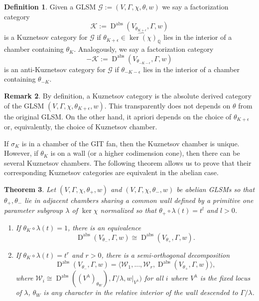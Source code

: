 \documentclass[reqno, 12pt]{amsart}
\newtheorem{theorem}{Theorem}[section]
\theoremstyle{definition}
\newtheorem{definition}[theorem]{Definition}
\newtheorem{remark}[theorem]{Remark}
\newcommand{\op}[1]{\operatorname{#1}}
\newcommand{\newterm}{\textsf}
\newcommand{\dabs}{\op{D}^{\op{abs}}}
\def\ker{\op{\mbox{ker}}}
\def\Q{\op{\mathbb{Q}}}
\numberwithin{equation}{section}
\begin{document}
\begin{definition}\label{def: Kuznetsov category}
    Given a GLSM $\mathcal{G} := (V, \Gamma, \chi, \theta, w)$ we say a factorization category
    $$
    \mathcal K := \dabs(V_{\theta_{K+\epsilon}}, \Gamma, w)
    $$
    is a \newterm{Kuznetsov category} for $\mathcal G$ if $\theta_{K+\epsilon} \in \widehat{\ker(\chi)}_{\Q}$ lies in the interior of a chamber containing $\theta_K$. Analogously, we say a factorization category
    $$
    -\mathcal K := \dabs(V_{\theta_{-K-\epsilon}}, \Gamma, w)
    $$
    is an \newterm{anti-Kuznetsov category} for $\mathcal G$ if $\theta_{-K-\epsilon}$ lies in the interior of a chamber containing $\theta_{-K}$.
\end{definition}

\begin{remark}
By definition, a Kuznetsov category is the absolute derived category of the GLSM $(V, \Gamma, \chi, \theta_{K+\epsilon}, w)$. This transparently does not depends on $\theta$ from the original GLSM.  On the other hand, it apriori depends on the choice of $\theta_{K+\epsilon}$ or, equivalently, the choice of Kuznetsov chamber. 
\end{remark}

If $\sigma_K$ is in a chamber of the GIT fan, then the Kuznetsov chamber is unique. However, if $\theta_K$ is on a wall (or a higher codimension cone), then there can be several Kuznetsov chambers. 
The following theorem \cite[Theorem 5.2.1]{BFKv2} allows us to prove that their corresponding Kuznetsov categories are equivalent in the abelian case.

\begin{theorem}\label{thm: BFK wall crossing} 
Let $(V, \Gamma, \chi, \theta_+, w)$ and $(V, \Gamma, \chi, \theta_-, w)$ be abelian GLSMs so that $\theta_+, \theta_-$ lie in adjacent chambers sharing a common wall defined by a primitive one parameter subgroup $\lambda$ of $\ker \chi$ normalized so that $\theta_+ \circ \lambda(t) = t^l$ and $l >0$.
\begin{enumerate}
\item If $\theta_K \circ \lambda (t)=1$, there is an equivalence
$$
 \dabs( V_{\theta_-}, \Gamma, w ) \cong \dabs(V_{\theta_+}, \Gamma, w).
$$
 \item If $\theta_K \circ \lambda (t) = t^r$  and $r>0$, there is a semi-orthogonal decomposition
$$
 \dabs( V_{\theta_-}, \Gamma, w ) = \langle \mathcal W_1, ..., \mathcal W_r, \dabs( V_{\theta_+}, \Gamma, w ) \rangle,
$$
where $\mathcal W_i \cong \dabs((V^\lambda)_{\theta_W}), \Gamma/\lambda, w|_{V^\lambda})$ for all $i$ where $V^\lambda$ is the fixed locus of $\lambda$, $\theta_W$ is any character in the relative interior of the wall descended to $\Gamma/\lambda$.
\end{enumerate}
\end{theorem}
  
\end{document}
